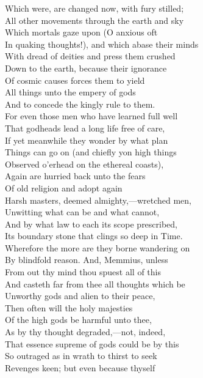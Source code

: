 Which were, are changed now, with fury stilled;\\
All other movements through the earth and sky\\
Which mortals gaze upon (O anxious oft\\
In quaking thoughts!), and which abase their minds\\
With dread of deities and press them crushed\\
Down to the earth, because their ignorance\\
Of cosmic causes forces them to yield\\
All things unto the empery of gods\\
And to concede the kingly rule to them.\\
For even those men who have learned full well\\
That godheads lead a long life free of care,\\
If yet meanwhile they wonder by what plan\\
Things can go on (and chiefly yon high things\\
Observed o'erhead on the ethereal coasts),\\
Again are hurried back unto the fears\\
Of old religion and adopt again\\
Harsh masters, deemed almighty,—wretched men,\\
Unwitting what can be and what cannot,\\
And by what law to each its scope prescribed,\\
Its boundary stone that clings so deep in Time.\\
Wherefore the more are they borne wandering on\\
By blindfold reason. And, Memmius, unless\\
From out thy mind thou spuest all of this\\
And casteth far from thee all thoughts which be\\
Unworthy gods and alien to their peace,\\
Then often will the holy majesties\\
Of the high gods be harmful unto thee,\\
As by thy thought degraded,—not, indeed,\\
That essence supreme of gods could be by this\\
So outraged as in wrath to thirst to seek\\
Revenges keen; but even because thyself\\
